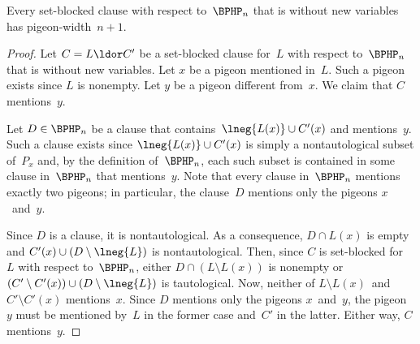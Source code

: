 \documentclass[12pt]{article}
\begin{document}
\begin{lemma}\label{thm:SBC-width-lower-bound-for-BPHP}
  Every set-blocked clause with respect to~$\BPHP_n$
  that is without new variables has pigeon-width~$n + 1$.
\end{lemma}
\begin{proof}
  Let $C = L \ldor C'$ be a set-blocked clause for~$L$
  with respect to~$\BPHP_n$ that is without new variables.
  Let $x$ be a pigeon mentioned in~$L$.
  Such a pigeon exists since $L$ is nonempty.
  Let $y$ be a pigeon different from~$x$.
  We claim that $C$ mentions~$y$.

  Let $D \in \BPHP_n$ be a clause
  that contains~$\lneg{L(x)} \cup C'(x)$ and mentions~$y$.
  Such a clause exists since $\lneg{L(x)} \cup C'(x)$ is
  simply a nontautological subset of~$P_x$
  and, by the definition of~$\BPHP_n$,
  each such subset is contained in
  some clause in~$\BPHP_n$ that mentions~$y$.
  Note that every clause in~$\BPHP_n$ mentions exactly two pigeons;
  in particular, the clause~$D$ mentions only the pigeons $x$~and~$y$.

  Since $D$ is a clause, it is nontautological.
  As a consequence, $D \cap L(x)$ is empty
  and $C'(x) \cup (D \setminus \lneg{L})$ is nontautological.
  Then, since $C$ is set-blocked for~$L$ with respect to~$\BPHP_n$,
  either $D \cap (L \setminus L(x))$ is nonempty
  or $(C' \setminus C'(x)) \cup (D \setminus \lneg{L})$ is tautological.
  Now, neither of $L \setminus L(x)$~and~$C' \setminus C'(x)$ mentions~$x$.
  Since $D$ mentions only the pigeons $x$~and~$y$,
  the pigeon~$y$ must be mentioned by~$L$ in the former case and~$C'$ in the latter.
  Either way, $C$ mentions~$y$.
\end{proof}
\end{document}
